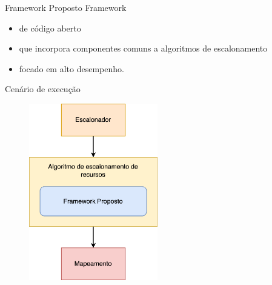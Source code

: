 \begin{frame}{Framework Proposto}
    Framework
    \begin{itemize}
        \item[] de código aberto
        \item[] que incorpora componentes comuns a algoritmos de escalonamento
        \item[] focado em alto desempenho.
    \end{itemize}
\end{frame}

\begin{frame}{Cenário de execução}
    \begin{figure}
        \centering
        \includegraphics[width=0.5\textwidth]{Figuras/framework_usage.png}
    \end{figure}
\end{frame}

